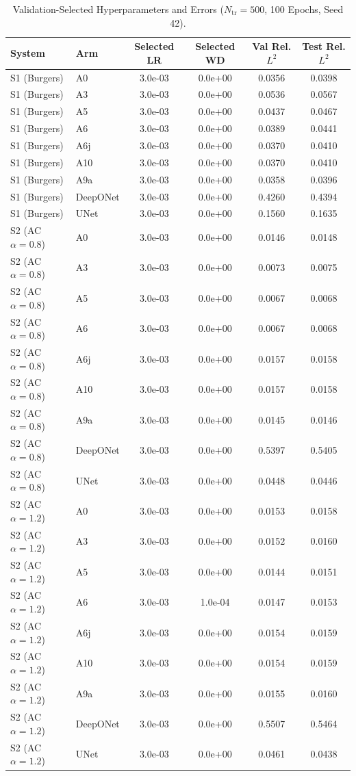 \begin{table}[t]
\centering
\small
\caption{Validation-Selected Hyperparameters and Errors ($N_{\text{tr}}=500$, 100 Epochs, Seed 42).}
\label{tab:selected_hparams}
\begin{tabular}{llcccc}
\toprule
System & Arm & Selected LR & Selected WD & Val Rel. $L^2$ & Test Rel. $L^2$ \\
\midrule
S1 (Burgers) & A0 & 3.0e-03 & 0.0e+00 & 0.0356 & 0.0398 \\
S1 (Burgers) & A3 & 3.0e-03 & 0.0e+00 & 0.0536 & 0.0567 \\
S1 (Burgers) & A5 & 3.0e-03 & 0.0e+00 & 0.0437 & 0.0467 \\
S1 (Burgers) & A6 & 3.0e-03 & 0.0e+00 & 0.0389 & 0.0441 \\
S1 (Burgers) & A6j & 3.0e-03 & 0.0e+00 & 0.0370 & 0.0410 \\
S1 (Burgers) & A10 & 3.0e-03 & 0.0e+00 & 0.0370 & 0.0410 \\
S1 (Burgers) & A9a & 3.0e-03 & 0.0e+00 & 0.0358 & 0.0396 \\
S1 (Burgers) & DeepONet & 3.0e-03 & 0.0e+00 & 0.4260 & 0.4394 \\
S1 (Burgers) & UNet & 3.0e-03 & 0.0e+00 & 0.1560 & 0.1635 \\
S2 (AC $\alpha=0.8$) & A0 & 3.0e-03 & 0.0e+00 & 0.0146 & 0.0148 \\
S2 (AC $\alpha=0.8$) & A3 & 3.0e-03 & 0.0e+00 & 0.0073 & 0.0075 \\
S2 (AC $\alpha=0.8$) & A5 & 3.0e-03 & 0.0e+00 & 0.0067 & 0.0068 \\
S2 (AC $\alpha=0.8$) & A6 & 3.0e-03 & 0.0e+00 & 0.0067 & 0.0068 \\
S2 (AC $\alpha=0.8$) & A6j & 3.0e-03 & 0.0e+00 & 0.0157 & 0.0158 \\
S2 (AC $\alpha=0.8$) & A10 & 3.0e-03 & 0.0e+00 & 0.0157 & 0.0158 \\
S2 (AC $\alpha=0.8$) & A9a & 3.0e-03 & 0.0e+00 & 0.0145 & 0.0146 \\
S2 (AC $\alpha=0.8$) & DeepONet & 3.0e-03 & 0.0e+00 & 0.5397 & 0.5405 \\
S2 (AC $\alpha=0.8$) & UNet & 3.0e-03 & 0.0e+00 & 0.0448 & 0.0446 \\
S2 (AC $\alpha=1.2$) & A0 & 3.0e-03 & 0.0e+00 & 0.0153 & 0.0158 \\
S2 (AC $\alpha=1.2$) & A3 & 3.0e-03 & 0.0e+00 & 0.0152 & 0.0160 \\
S2 (AC $\alpha=1.2$) & A5 & 3.0e-03 & 0.0e+00 & 0.0144 & 0.0151 \\
S2 (AC $\alpha=1.2$) & A6 & 3.0e-03 & 1.0e-04 & 0.0147 & 0.0153 \\
S2 (AC $\alpha=1.2$) & A6j & 3.0e-03 & 0.0e+00 & 0.0154 & 0.0159 \\
S2 (AC $\alpha=1.2$) & A10 & 3.0e-03 & 0.0e+00 & 0.0154 & 0.0159 \\
S2 (AC $\alpha=1.2$) & A9a & 3.0e-03 & 0.0e+00 & 0.0155 & 0.0160 \\
S2 (AC $\alpha=1.2$) & DeepONet & 3.0e-03 & 0.0e+00 & 0.5507 & 0.5464 \\
S2 (AC $\alpha=1.2$) & UNet & 3.0e-03 & 0.0e+00 & 0.0461 & 0.0438 \\
\bottomrule
\end{tabular}
\end{table}
